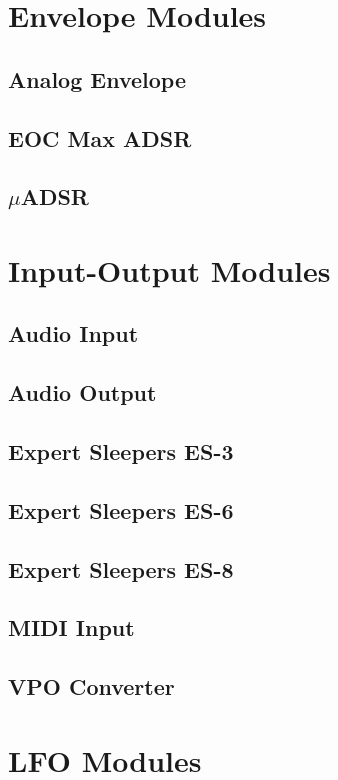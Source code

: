 \documentclass[11pt]{book}
\begin{document}
\chapter{Envelope Modules}
\pagebreak
\section{Analog Envelope}
\pagebreak
\section{EOC Max ADSR}
\pagebreak
\section{$\mu$ADSR}
\pagebreak

\chapter{Input-Output Modules}
\pagebreak
\section{Audio Input}
\pagebreak
\section{Audio Output}
\pagebreak
\section{Expert Sleepers ES-3}
\pagebreak
\section{Expert Sleepers ES-6}
\pagebreak
\section{Expert Sleepers ES-8}
\pagebreak
\section{MIDI Input}
\pagebreak
\section{VPO Converter}
\pagebreak

\chapter{LFO Modules}
\pagebreak
\end{document}
